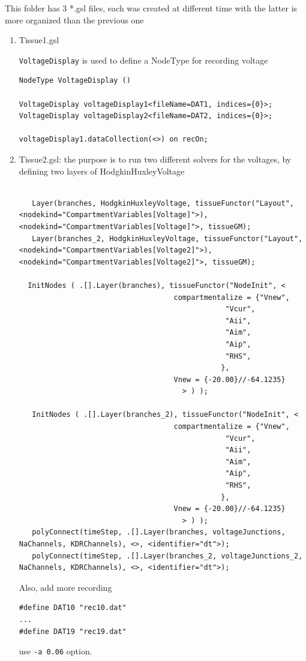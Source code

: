 This folder has 3 *.gsl files, each was created at different time with the
latter is more organized than the previous one
\begin{enumerate}
  \item Tissue1.gsl 
  
\verb!VoltageDisplay! is used to define a NodeType for recording voltage
\begin{verbatim}
NodeType VoltageDisplay ()

VoltageDisplay voltageDisplay1<fileName=DAT1, indices={0}>;
VoltageDisplay voltageDisplay2<fileName=DAT2, indices={0}>;

voltageDisplay1.dataCollection(<>) on recOn;
\end{verbatim}  
  
  \item Tissue2.gsl: the purpose is to run two different solvers for the
  voltages, by defining two layers of HodgkinHuxleyVoltage

\begin{verbatim}

   Layer(branches, HodgkinHuxleyVoltage, tissueFunctor("Layout", <nodekind="CompartmentVariables[Voltage]">), <nodekind="CompartmentVariables[Voltage]">, tissueGM);
   Layer(branches_2, HodgkinHuxleyVoltage, tissueFunctor("Layout", <nodekind="CompartmentVariables[Voltage2]">), <nodekind="CompartmentVariables[Voltage2]">, tissueGM);

  InitNodes ( .[].Layer(branches), tissueFunctor("NodeInit", <
									compartmentalize = {"Vnew", 
											    "Vcur", 
											    "Aii", 
											    "Aim", 
											    "Aip", 
											    "RHS", 
											   },
									Vnew = {-20.00}//-64.1235}
								      > ) );

   InitNodes ( .[].Layer(branches_2), tissueFunctor("NodeInit", <
									compartmentalize = {"Vnew", 
											    "Vcur", 
											    "Aii", 
											    "Aim", 
											    "Aip", 
											    "RHS", 
											   },
									Vnew = {-20.00}//-64.1235}
								      > ) );
   polyConnect(timeStep, .[].Layer(branches, voltageJunctions, NaChannels, KDRChannels), <>, <identifier="dt">);
   polyConnect(timeStep, .[].Layer(branches_2, voltageJunctions_2, NaChannels, KDRChannels), <>, <identifier="dt">);

\end{verbatim}  
  
Also,  add more recording 
\begin{verbatim}
#define DAT10 "rec10.dat"
...
#define DAT19 "rec19.dat"
\end{verbatim}
use \verb!-a 0.06! option.


\end{enumerate}
